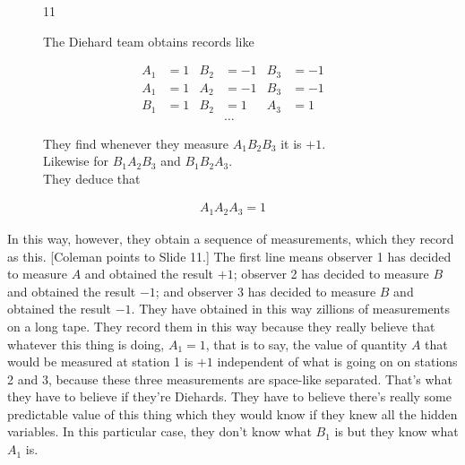 \documentclass[twocolumn,prb]{revtex4}
\begin{document}
\begin{figure}[htb] 
\begin{mdframed}
  \vspace{5pt}\hfill 11\\ %
  \begin{raggedright}
    The Diehard team obtains records like
  \end{raggedright}
\begin{align}\nonumber
  &&  A_1&=1 &B_2&=-1 &B_3&=-1&&\\\nonumber
  &&  A_1&=1 &A_2&=-1 &B_3&=-1&&\\\nonumber
  &&  B_1&=1 &B_2&=1  &A_3&=1 &&\\\nonumber
   &&&&&          \ldots   &&&&
\end{align}

\begin{raggedright}
  They find whenever they measure
  $A_1B_2B_3$ it is $+1$.\\
  Likewise for $B_1A_2B_3$ and $B_1B_2A_3$.\\[\baselineskip]
  They deduce that\\[-1.2\baselineskip]
\end{raggedright}
\begin{align}\nonumber
  \boxed{A_1A_2A_3=1} %
\end{align}
\vspace{-.5\baselineskip}
\end{mdframed}
\end{figure}
In this way, however, they obtain a sequence of measurements, which they record as this. [Coleman points to Slide 11.] The first line means observer 1 has decided to measure $A$ and obtained the result $+1$; observer 2 has decided to measure $B$ and obtained the result $-1$; and observer 3 has decided to measure $B$ and obtained the result $-1$. They have obtained in this way zillions of measurements on a long tape. They record them in this way because they really believe that whatever this thing is doing, $A_1=1$, that is to say, the value of quantity $A$ that would be measured at station 1 is $+1$ independent of what is going on on stations 2 and 3, because these three measurements are space-like separated. That's what they have to believe if they're Diehards. They have to believe there's really some predictable value of this thing which they would know if they knew all the hidden variables. In this particular case, they don't know what $B_1$ is but they know what $A_1$ is.
\end{document}
